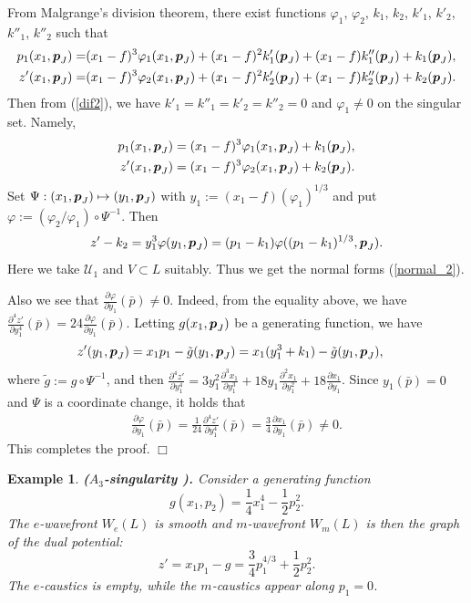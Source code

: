 \documentclass[10pt]{amsart}
\def\qed{\hfill $\Box$}
\newcommand{\U}{\mathcal{U}}
\def\qed{\hfill $\Box$}
\def\rd{\partial}
\def\bp{\mbox{\boldmath $p$}}
\newtheorem{exam}[thm]{\bf Example}
\newcommand{\vp}{\varphi}
\begin{document}
From Malgrange's division theorem, there exist functions $\vp_1$, $\vp_2$, $k_1$, $k_2$, $k'_1$, $k'_2$, $k''_1$, $k''_2$ such that 
\begin{align*}
p_1(x_1,\bp_J) = &(x_1-f)^3\varphi_1(x_1,\bp_J)+ (x_1-f)^2k'_1(\bp_J) + (x_1-f)k''_1(\bp_J) + k_1(\bp_J),\\
z'(x_1,\bp_J) = &(x_1-f)^3\varphi_2(x_1,\bp_J)+ (x_1-f)^2k'_2(\bp_J) + (x_1-f)k''_2(\bp_J) + k_2(\bp_J).
\end{align*}
Then from (\ref{dif2}), we have $k'_1 =k''_1=k'_2 =k''_2=0$ and $\vp_1\neq 0$ on the singular set. 
Namely, 
\begin{align*}
p_1(x_1,\bp_J) &= (x_1-f)^3\varphi_1(x_1,\bp_J)+ k_1(\bp_J),\\
z'(x_1,\bp_J) &= (x_1-f)^3\varphi_2(x_1,\bp_J)+k_2(\bp_J).
\end{align*}
Set $\Psi:(x_1,\bp_J)\mapsto(y_1,\bp_J)$ with $y_1:=(x_1-f)(\varphi_1)^{1/3}$ and put $\vp:=(\vp_2/\vp_1)\circ\Psi^{-1}$.
Then
$$z'-k_2 = y_1^3\vp(y_1,\bp_J) = (p_1-k_1)\vp((p_1-k_1)^{1/3}, \bp_J).$$
Here we take $\U_1$ and $V\subset L$ suitably. Thus we get the normal forms (\ref{normal_2}). 

Also we see that $\frac{\rd \vp}{\rd y_1}(\bar{p})\neq 0$. Indeed, from the equality above, we have
$\frac{\rd^4 z'}{\rd y_1^4}(\bar{p})=24\frac{\rd\vp}{\rd y_1}(\bar{p})$.
Letting $g(x_1, \bp_J)$ be a generating function, we have
\begin{align*}
z'(y_1,\bp_J) &= x_1p_1 - \tilde{g}(y_1,\bp_J)= x_1(y_1^3 + k_1) - \tilde{g}(y_1,\bp_J),
\end{align*}
where $\tilde{g}:=g\circ\Psi^{-1}$, and then $\frac{\rd^4 z'}{\rd y_1^4}=3y_1^2\frac{\rd^3 x_1}{\rd y_1^3}+18y_1\frac{\rd^2 x_1}{\rd y_1^2}+18\frac{\rd x_1}{\rd y_1}$. 
Since $y_1(\bar{p})=0$ and $\Psi$ is a coordinate change, it holds that
\begin{align*}
\frac{\rd\vp}{\rd y_1}(\bar{p}) = \frac{1}{24}\frac{\rd^4 z'}{\rd y_1^4}(\bar{p}) = \frac{3}{4}\frac{\rd x_1}{\rd y_1}(\bar{p})\neq 0.
\end{align*}
This completes the proof. 
\qed


\begin{exam}\label{semi-definite}\upshape
{\bf  ($A_3$-singularity \cite{Vasil'ev}).} Consider a generating function 
$$g(x_1, p_2) = \frac{1}{4}x_1^4 - \frac{1}{2}p_2^2.$$ 
The $e$-wavefront $W_e(L)$ is smooth and $m$-wavefront $W_m(L)$ is then the graph of the dual potential: 
$$z'=x_1p_1-g=\frac{3}{4}p_1^{4/3}+\frac{1}{2}p_2^2.$$ 
The $e$-caustics is empty, while the $m$-caustics appear along $p_1=0$. 
\end{exam}
\end{document}
